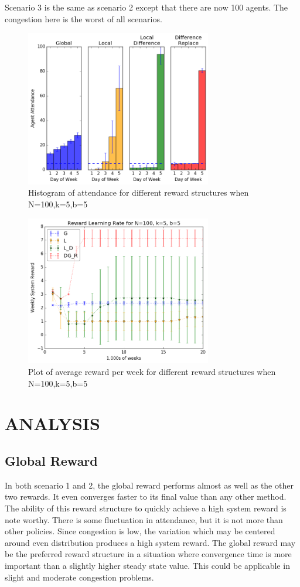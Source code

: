 \documentclass[letterpaper, 10 pt, conference]{ieeeconf}
\begin{document}
Scenario 3 is the same as scenario 2 except that there are now 100 agents.  The congestion here is the worst of all scenarios.
\begin{figure}
    \centering
    \includegraphics[width=230pt]{Histograms2.png}
    \caption{Histogram of attendance for different reward structures when N=100,k=5,b=5}
    \label{fig:Scenario3_hist}
\end{figure}

\begin{figure}
    \centering
    \includegraphics[width=230pt]{Scatter2.png}
    \caption{Plot of average reward per week for different reward structures when N=100,k=5,b=5}
    \label{fig:scenario3_scatter}
\end{figure}

\section{ANALYSIS}
\label{sec:analysis}
\subsection{Global Reward}
In both scenario 1 and 2, the global reward performs almost as well as the other two rewards.  It even converges faster to its final value than any other method.  The ability of this reward structure to quickly achieve a high system reward is note worthy.  There is some fluctuation in attendance, but it is not more than other policies.  Since congestion is low, the variation which may be centered around even distribution produces a high system reward.  The global reward may be the preferred reward structure in a situation where convergence time is more important than a slightly higher steady state value.  This could be applicable in slight and moderate congestion problems.
\end{document}

